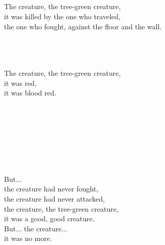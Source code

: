 \documentclass{ctexart}
\begin{document}
\noindent
\begin{minipage}[t]{5.75cm}
{\textCJKserif{}\large
  \\
  \\
  \\
  \\
  \scriptsize
  The creature, the tree-green creature,\\
  it was killed
  by the one who traveled,\\
  the one who fought, against the floor and the wall.\\
}
\end{minipage}
\begin{minipage}[t]{5.75cm}
{\textCJKserif{}\large
  \\
  \\
  \\
  \scriptsize
  The creature, the tree-green creature,\\
  it was red,\\
  it was blood red.\\
}
\end{minipage}
\begin{minipage}[t]{5.75cm}
{\textCJKserif{}\large
  \\
  \\
  \\
  \\
  \\
  \\
  \\
  \scriptsize
  But...\\
  the creature had never fought,\\
  the creature had never attacked,\\
  the creature, the tree-green creature,\\
  it was a good, good creature.\\
  But... the creature...\\
  it was no more.\\
}
\end{minipage}
\end{document}
